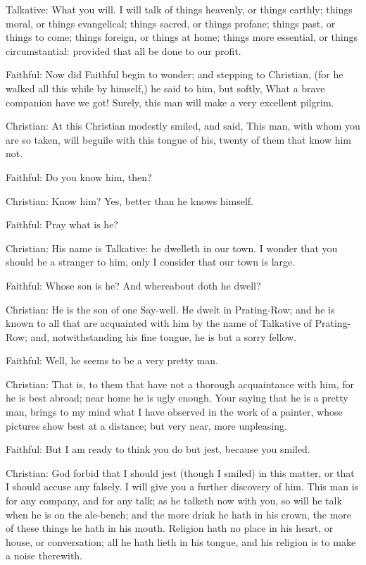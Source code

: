Talkative: What you will. I will talk of things heavenly, or things earthly; things moral, or things evangelical; things sacred, or things profane; things past, or things to come; things foreign, or things at home; things more essential, or things circumstantial: provided that all be done to our profit.

Faithful: Now did Faithful begin to wonder; and stepping to Christian, (for he walked all this while by himself,) he said to him, but softly, What a brave companion have we got! Surely, this man will make a very excellent pilgrim.

Christian: At this Christian modestly smiled, and said, This man, with whom you are so taken, will beguile with this tongue of his, twenty of them that know him not.

Faithful: Do you know him, then?

Christian: Know him? Yes, better than he knows himself.

Faithful: Pray what is he?

Christian: His name is Talkative: he dwelleth in our town. I wonder that you should be a stranger to him, only I consider that our town is large.

Faithful: Whose son is he? And whereabout doth he dwell?

Christian: He is the son of one Say-well. He dwelt in Prating-Row; and he is known to all that are acquainted with him by the name of Talkative of Prating-Row; and, notwithstanding his fine tongue, he is but a sorry fellow.

Faithful: Well, he seems to be a very pretty man.

Christian: That is, to them that have not a thorough acquaintance with him, for he is best abroad; near home he is ugly enough. Your saying that he is a pretty man, brings to my mind what I have observed in the work of a painter, whose pictures show best at a distance; but very near, more unpleasing.

Faithful: But I am ready to think you do but jest, because you smiled.

Christian: God forbid that I should jest (though I smiled) in this matter, or that I should accuse any falsely. I will give you a further discovery of him. This man is for any company, and for any talk; as he talketh now with you, so will he talk when he is on the ale-bench; and the more drink he hath in his crown, the more of these things he hath in his mouth. Religion hath no place in his heart, or house, or conversation; all he hath lieth in his tongue, and his religion is to make a noise therewith.

